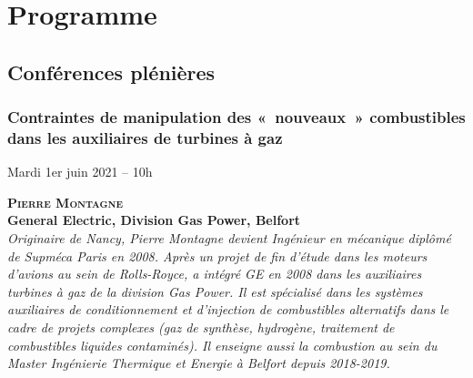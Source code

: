 \chapter{Programme}


\section*{Conférences plénières}


\subsection*{Contraintes de manipulation des « nouveaux » combustibles dans les auxiliaires de turbines à gaz}
%
\begin{center}
Mardi 1er juin 2021 -- 10h
\end{center}

\hspace{0.04\linewidth}\vrule\hspace{0.01\linewidth}\parbox{0.88\linewidth}{
\textbf{{\scshape Pierre Montagne}\\ General Electric, Division Gas Power, Belfort}\\
{\slshape  Originaire de Nancy, Pierre Montagne devient Ingénieur en mécanique diplômé de Supméca Paris en 2008. Après un projet de fin d’étude dans les moteurs d’avions au sein de Rolls-Royce, a intégré GE en 2008 dans les auxiliaires turbines à gaz de la division Gas Power. Il est spécialisé dans les systèmes auxiliaires de conditionnement et d’injection de combustibles alternatifs dans le cadre de projets complexes (gaz de synthèse, hydrogène, traitement de combustibles liquides contaminés). Il enseigne aussi la combustion au sein du Master Ingénierie Thermique et Energie à Belfort depuis 2018-2019.}}\\[2ex]

\vspace{1cm}

